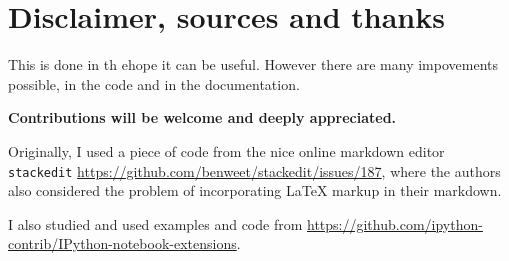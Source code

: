     \section{Disclaimer, sources and
thanks}\label{disclaimer-sources-and-thanks}

    This is done in th ehope it can be useful. However there are many
impovements possible, in the code and in the documentation.

\textbf{Contributions will be welcome and deeply appreciated.}

Originally, I used a piece of code from the nice online markdown editor
\texttt{stackedit}
\url{https://github.com/benweet/stackedit/issues/187}, where the authors
also considered the problem of incorporating LaTeX markup in their
markdown.

I also studied and used examples and code from
\url{https://github.com/ipython-contrib/IPython-notebook-extensions}.

    